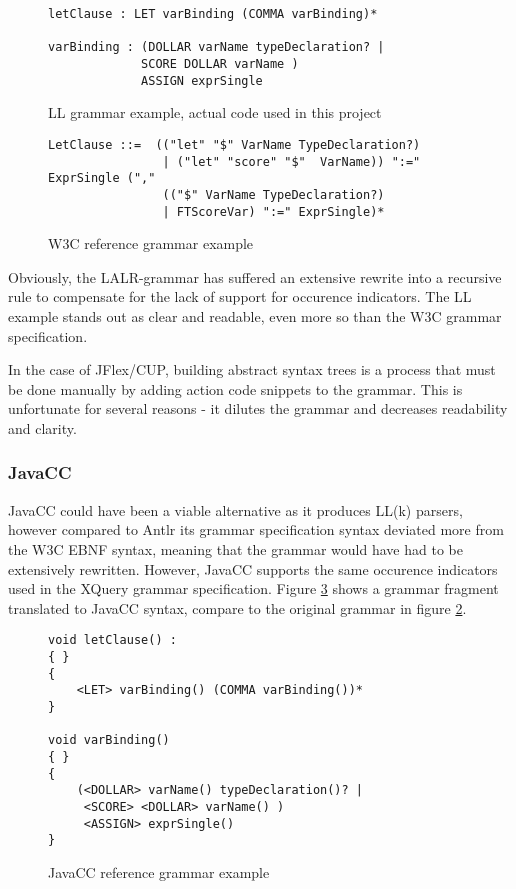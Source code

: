 \begin{figure}[h!]
\begin{verbatim}
letClause : LET varBinding (COMMA varBinding)*

varBinding : (DOLLAR varName typeDeclaration? | 
             SCORE DOLLAR varName )
             ASSIGN exprSingle
\end{verbatim}
\caption[LL grammar example]{LL grammar example, actual code used in this project}
\label{code:parsers:ll}
\end{figure}

\begin{figure}[h!]
\begin{verbatim}
LetClause ::=  (("let" "$" VarName TypeDeclaration?) 
 				| ("let" "score" "$"  VarName)) ":=" ExprSingle ("," 
 				(("$" VarName TypeDeclaration?) 
 				| FTScoreVar) ":=" ExprSingle)*
\end{verbatim}
\caption{ W3C reference grammar example }
\label{code:parsers:w3c}
\end{figure}

Obviously, the LALR-grammar has suffered an extensive rewrite into a recursive
rule to compensate for the lack of support for occurence indicators. The LL
example stands out as clear and readable, even more so than the W3C
grammar specification.

In the case of JFlex/CUP, building abstract syntax trees is a process that must
be done manually by adding action code snippets to the grammar. This is
unfortunate for several reasons - it dilutes the grammar and decreases
readability and clarity.


\subsubsection{JavaCC}
JavaCC could have been a viable alternative as it produces LL(k) parsers,
however compared to Antlr its grammar specification syntax deviated more
from the W3C EBNF syntax, meaning that the grammar would have had to be
extensively rewritten. However, JavaCC supports the same occurence indicators
used in the XQuery grammar specification. Figure \ref{code:parsers:javacc} shows
a grammar fragment translated to JavaCC syntax, compare to the original grammar
in figure \ref{code:parsers:w3c}.

\begin{figure}[h!]
\begin{verbatim}
void letClause() :
{ }
{
    <LET> varBinding() (COMMA varBinding())*
} 

void varBinding()
{ }
{
    (<DOLLAR> varName() typeDeclaration()? | 
     <SCORE> <DOLLAR> varName() )
     <ASSIGN> exprSingle()
}
\end{verbatim}
\caption{ JavaCC reference grammar example }
\label{code:parsers:javacc}
\end{figure}

